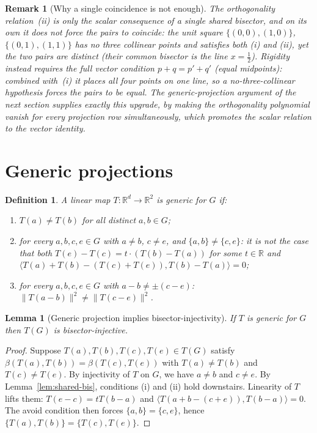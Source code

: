 \documentclass[12pt]{article}
\newtheorem{lemma}[theorem]{Lemma}
\newtheorem{definition}[theorem]{Definition}
\newtheorem{remark}[theorem]{Remark}
\newcommand{\R}{\mathbb{R}}
\newcommand{\bis}[2]{\beta(#1,#2)}  %
\newcommand{\ip}[2]{\langle #1,#2\rangle}
\newcommand{\norm}[1]{\|#1\|}
\begin{document}
\begin{remark}[Why a single coincidence is not enough]
\label{rem:single}
The orthogonality relation~(ii) is only the scalar consequence of a
\emph{single} shared bisector, and on its own it does \emph{not} force the
pairs to coincide: the unit square $\{(0,0),(1,0)\}$, $\{(0,1),(1,1)\}$ has no
three collinear points and satisfies both (i) and (ii), yet the two pairs are
distinct (their common bisector is the line $x=\tfrac12$).  Rigidity instead
requires the full \emph{vector} condition $p+q=p'+q'$ (equal midpoints):
combined with~(i) it places all four points on one line, so a
no-three-collinear hypothesis forces the pairs to be equal.  The
generic-projection argument of the next section supplies exactly this upgrade,
by making the orthogonality polynomial vanish for \emph{every} projection row
simultaneously, which promotes the scalar relation to the vector identity.
\end{remark}

\section{Generic projections}

\begin{definition}
A linear map $T\colon\R^d\to\R^2$ is \emph{generic for $G$} if:
\begin{enumerate}
  \item[(inj)] $T(a)\ne T(b)$ for all distinct $a,b\in G$;
  \item[(avoid)] for every $a,b,c,e\in G$ with $a\ne b$, $c\ne e$, and
        $\{a,b\}\ne\{c,e\}$: it is not the case that both
        $T(e)-T(c)=t\cdot(T(b)-T(a))$ for some $t\in\R$ \emph{and}
        $\ip{T(a)+T(b)-(T(c)+T(e))}{T(b)-T(a)}=0$;
  \item[(sep)] for every $a,b,c,e\in G$ with $a-b\ne\pm(c-e)$:
        $\norm{T(a-b)}^2\ne\norm{T(c-e)}^2$.
\end{enumerate}
\end{definition}

\begin{lemma}[Generic projection implies bisector-injectivity]
\label{lem:gen-implies-inj}
If $T$ is generic for $G$ then $T(G)$ is bisector-injective.
\end{lemma}

\begin{proof}
Suppose $T(a),T(b),T(c),T(e)\in T(G)$ satisfy
$\bis{T(a)}{T(b)}=\bis{T(c)}{T(e)}$ with $T(a)\ne T(b)$ and $T(c)\ne T(e)$.
By injectivity of $T$ on $G$, we have $a\ne b$ and $c\ne e$.
By Lemma~\ref{lem:shared-bis}, conditions (i) and (ii) hold downstairs.
Linearity of $T$ lifts them: $T(e-c)=tT(b-a)$ and $\ip{T(a+b-(c+e))}{T(b-a)}=0$.
The avoid condition then forces $\{a,b\}=\{c,e\}$, hence $\{T(a),T(b)\}=\{T(c),T(e)\}$.
\end{proof}
\end{document}
